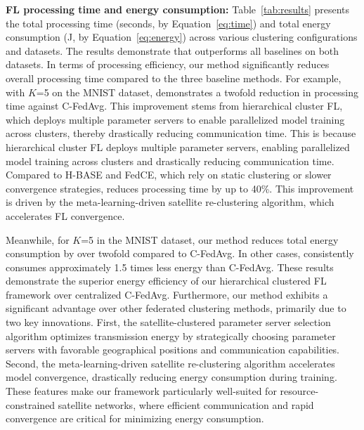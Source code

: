 \textbf{FL processing time and energy consumption:} Table~\ref{tab:results} presents the total processing time (seconds, by Equation~\ref{eq:time}) and total energy consumption (J, by Equation~\ref{eq:energy}) across various clustering configurations and datasets. The results demonstrate that \algname outperforms all baselines on both datasets. In terms of processing efficiency, our method significantly reduces overall processing time compared to the three baseline methods. For example, with $K$=5 on the MNIST dataset, \algname demonstrates a twofold reduction in processing time against C-FedAvg. This improvement stems from hierarchical cluster FL, which deploys multiple parameter servers to enable parallelized model training across clusters, thereby drastically reducing communication time. This is because hierarchical cluster FL deploys multiple parameter servers, enabling parallelized model training across clusters and drastically reducing communication time. Compared to H-BASE and FedCE, which rely on static clustering or slower convergence strategies, \algname reduces processing time by up to 40\%. This improvement is driven by the meta-learning-driven satellite re-clustering algorithm, which accelerates FL convergence.


Meanwhile, for $K$=5 in the MNIST dataset, our method reduces total energy consumption by over twofold compared to C-FedAvg. In other cases, \algname consistently consumes approximately 1.5 times less energy than C-FedAvg. These results demonstrate the superior energy efficiency of our hierarchical clustered FL framework over centralized C-FedAvg. Furthermore, our method exhibits a significant advantage over other federated clustering methods, primarily due to two key innovations. First, the satellite-clustered parameter server selection algorithm optimizes transmission energy by strategically choosing parameter servers with favorable geographical positions and communication capabilities. Second, the meta-learning-driven satellite re-clustering algorithm accelerates model convergence, drastically reducing energy consumption during training. These features make our framework particularly well-suited for resource-constrained satellite networks, where efficient communication and rapid convergence are critical for minimizing energy consumption. 


